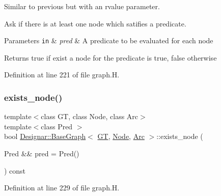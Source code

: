 Similar to previous but with an rvalue parameter. 

Ask if there is at least one node which satifies a predicate.


\begin{DoxyParams}[1]{Parameters}
\mbox{\tt in}  & {\em pred} & A predicate to be evaluated for each node \\
\hline
\end{DoxyParams}
\begin{DoxyReturn}{Returns}
{\ttfamily true} if exist a node for the predicate is true, {\ttfamily false} otherwise 
\end{DoxyReturn}


Definition at line 221 of file graph.\+H.

\mbox{\label{class_designar_1_1_base_graph_a62df2c7ec71d2b009e96f8974968a3fc}} 
\subsubsection{\texorpdfstring{exists\+\_\+node()}{exists\_node()}\hspace{0.1cm}{\footnotesize\ttfamily [2/2]}}
{\footnotesize\ttfamily template$<$class GT, class Node, class Arc$>$ \\
template$<$class Pred $>$ \\
bool \hyperlink{class_designar_1_1_base_graph}{Designar\+::\+Base\+Graph}$<$ \hyperlink{demo-buildgraph_8_c_a3001c40d2c31ca87ed96cd7d1334a55e}{GT}, \hyperlink{namespace_designar_a5af326c65aa2bd26b26c410f2030d09e}{Node}, \hyperlink{namespace_designar_a3f55fb5513d62ff47cbc8f72b8e95d6f}{Arc} $>$\+::exists\+\_\+node (\begin{DoxyParamCaption}\item[{Pred \&\&}]{pred = {\ttfamily Pred()} }\end{DoxyParamCaption}) const\hspace{0.3cm}{\ttfamily [inline]}}



Definition at line 229 of file graph.\+H.

\mbox{\label{class_designar_1_1_base_graph_a5e35c97bdf055f67e744f7d961ccb6a9}} 
